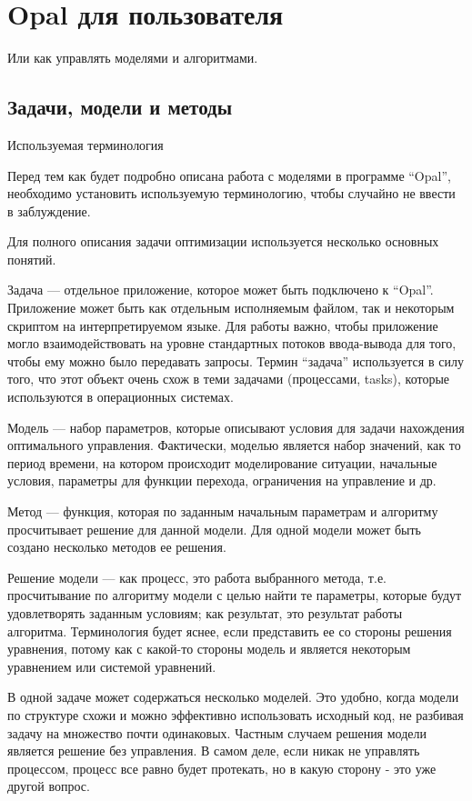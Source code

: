 \chapter{Opal для пользователя}

Или как управлять моделями и алгоритмами.

\section{Задачи, модели и методы}

Используемая терминология

Перед тем как будет подробно описана работа с моделями в программе “Opal”, необходимо установить используемую терминологию, чтобы случайно не ввести в заблуждение.

Для полного описания задачи оптимизации используется несколько основных понятий.

Задача — отдельное приложение, которое может быть подключено к “Opal”. Приложение может быть как отдельным исполняемым файлом, так и некоторым скриптом на интерпретируемом языке. Для работы важно, чтобы приложение могло взаимодействовать на уровне стандартных потоков ввода-вывода для того, чтобы ему можно было передавать запросы. Термин “задача” используется в силу того, что этот объект очень схож в теми задачами (процессами, tasks), которые используются в операционных системах.

Модель — набор параметров, которые описывают условия для задачи нахождения оптимального управления. Фактически, моделью является набор значений, как то период времени, на котором происходит моделирование ситуации, начальные условия, параметры для функции перехода, ограничения на управление и др.

Метод — функция, которая по заданным начальным параметрам и алгоритму просчитывает решение для данной модели. Для одной модели может быть создано несколько методов ее решения.

Решение модели — как процесс, это работа выбранного метода, т.е. просчитывание по алгоритму модели с целью найти те параметры, которые будут удовлетворять заданным условиям; как результат, это результат работы алгоритма. Терминология будет яснее, если представить ее со стороны решения уравнения, потому как с какой-то стороны модель и является некоторым уравнением или системой уравнений.

В одной задаче может содержаться несколько моделей. Это удобно, когда модели по структуре схожи и можно эффективно использовать исходный код, не разбивая задачу на множество почти одинаковых. Частным случаем решения модели является решение без управления. В самом деле, если никак не управлять процессом, процесс все равно будет протекать, но в какую сторону - это уже другой вопрос.

